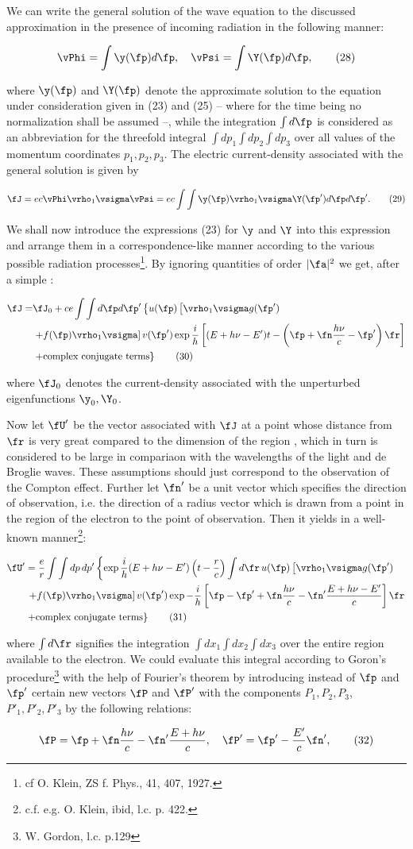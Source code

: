\documentclass{article}
\newcommand{\nequ}[2]{
\begin{align*}
#1
\tag{#2}
\end{align*}
}
\begin{document}
We can write the general solution of the wave equation to the discussed approximation in the presence of incoming radiation in the following manner:
\nequ{
\vPhi = \int{\y(\fp){d\fp}},\quad
\vPsi = \int{\Y(\fp){d\fp}},
}{28}
where $\y(\fp)$ and $\Y(\fp)$ denote the approximate solution to the equation under consideration given in (23) and (25) -- where for the time being no normalization shall be assumed --, while the integration $\int{d\fp}$ is considered as an abbreviation for the threefold integral $\int{dp_1}\int{dp_2}\int{dp_3}$ over all values of the momentum coordinates $p_1,p_2,p_3$. The electric current-density associated with the general solution is given by
\nequ{
\fJ = ec\vPhi \vrho_1 \vsigma \vPsi = ec\int{\int{\y(\fp)\vrho_1\vsigma\Y(\fp'){d\fp}{d\fp'}}}.
}{29}
We shall now introduce the expressions (23) for $\y$ and $\Y$ into this expression and arrange them in a correspondence-like manner according to the various possible radiation processes\footnote{cf O. Klein, ZS f. Phys., 41, 407, 1927.}. By ignoring quantities of order $|\fa|^2$ we get, after a simple :
\nequ{
\fJ = &\fJ_0 + ce\int\int{d\fp}{d\fp'}\left\{u(\fp)\left[\vrho_1 \vsigma g(\fp')\right.\right.\\
 &\left. + f(\fp)\vrho_1\vsigma\right] v(\fp')\exp{\frac{i}{h}\left[
 (E + h\nu - E')t - \left(\fp + \fn\frac{h\nu}{c} - \fp'\right)\fr\right]}\\
 &\left.+ \text{complex conjugate terms}\right\}
}{30}
where $\fJ_0$ denotes the current-density associated with the unperturbed eigenfunctions $\y_0, \Y_0$.

Now let $\fU'$ be the vector associated with $\fJ$ at a point whose distance from $\fr$ is very great compared to the dimension of the region , which in turn is considered to be large in compariaon with the wavelengths of the light and de Broglie waves. These assumptions should just correspond to the observation of the Compton effect. Further let $\fn'$ be a unit vector which specifies the direction of observation, i.e. the direction of a radius vector which is drawn from a point in the region of the electron to the point of observation. Then it yields in a well-known manner\footnote{c.f. e.g. O. Klein, ibid, l.c. p. 422.}:
\nequ{
\fU' &=  \frac{e}{r}\int\int{dp}\,{dp'}\left\{
\exp{\frac{i}{h}(E + h\nu - E')\left(t - \frac{r}{c}\right)}
\int{d\fr}\,u(\fp)\left[\vrho_1 \vsigma g(\fp')\right.\right.\\
&\left.\left. + f(\fp)\vrho_1 \vsigma\right] v(\fp')
\exp{-\frac{i}{h}\left[\fp - \fp' + \fn\frac{h\nu}{c} - \fn'\frac{E+h\nu-E'}{c}\right]\fr}\right.\\
&\left.+ \text{complex conjugate terms} \right\}
}{31}
where $\int{d\fr}$ signifies the integration $\int{dx_1}\int{dx_2}\int{dx_3}$ over the entire region available to the electron. We could evaluate this integral according to Goron's procedure\footnote{W. Gordon, l.c. p.129} with the help of Fourier's theorem by introducing instead of $\fp$ and $\fp'$ certain new vectors $\fP$ and $\fP'$ with the components $P_1, P_2, P_3$, $P'_1, P'_2, P'_3$ by the following relations:
\nequ{
\fP = \fp + \fn\frac{h\nu}{c} - \fn'\frac{E+h\nu}{c},\quad
\fP' = \fp' - \frac{E'}{c}\fn',
}{32}
\end{document}

